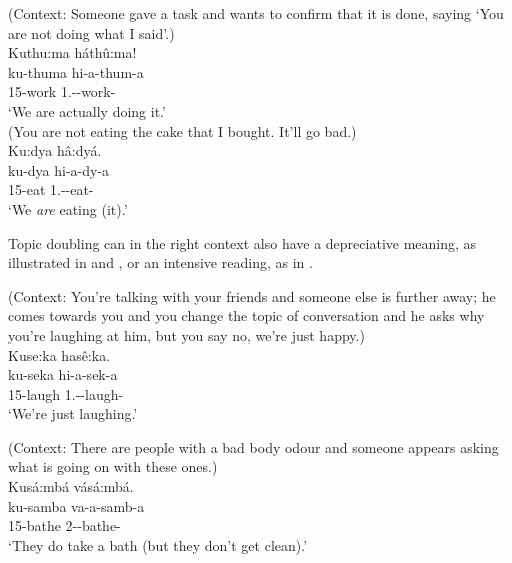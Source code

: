\documentclass[output=paper]{langscibook}
\begin{document}
\ea
\label{bkm:Ref121149920}
(Context: Someone gave a task and wants to confirm that it is done, saying ‘You are not doing what I said’.)\\
Kuthu:ma háthû:ma!\\
\gll
ku-thuma  hi-a-thum-a\\
15-work  1\PL.\SM-\DJ{}-work-\FV{}\\
\glt
‘We are actually doing it.’\\

\ex
\label{bkm:Ref103676347}
(You are not eating the cake that I bought. It’ll go bad.)\\
Ku:dya hâ:dyá.\\
\gll
ku-dya  hi-a-dy-a\\
15-eat  1\PL.\SM{}-\DJ{}-eat-\FV{}\\
\glt
‘We \textit{are} eating (it).’\\

\z

Topic doubling can in the right context also have a depreciative meaning, as illustrated in  and , or an intensive reading, as in .

\ea
\label{bkm:Ref120700175}
(Context: You’re talking with your friends and someone else is further away; he comes towards you and you change the topic of conversation and he asks why you’re laughing at him, but you say no, we’re just happy.)\\
Kuse:ka hasê:ka.\\
ku-seka  hi-a-sek-a\\
15-laugh  1\PL.\SM-\DJ{}-laugh-\FV{}\\
‘We’re just laughing.’

\ex
\label{bkm:Ref141429345}
(Context: There are people with a bad body odour and someone appears asking what is going on with these ones.)\\
Kusá:mbá vásá:mbá.\\
\gll
ku-samba  va-a-samb-a\\
15-bathe  2\SM-\DJ{}-bathe-\FV{}\\
\glt
‘They do take a bath (but they don’t get clean).’\\
\end{document}

